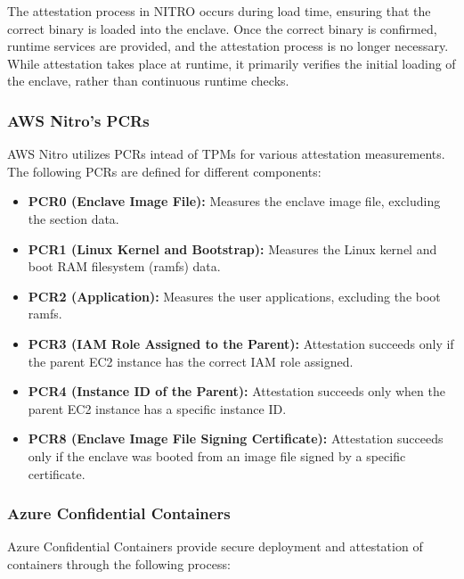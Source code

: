 The attestation process in NITRO occurs during load time, ensuring
that the correct binary is loaded into the enclave. Once the correct
binary is confirmed, runtime services are provided, and the
attestation process is no longer necessary. While attestation takes
place at runtime, it primarily verifies the initial loading of the
enclave, rather than continuous runtime checks.


\subsubsection{AWS Nitro's PCRs}

AWS Nitro utilizes PCRs intead of TPMs for various attestation
measurements. The following PCRs are defined for different components:

\begin{itemize}
    \item \textbf{PCR0 (Enclave Image File):} Measures the enclave
      image file, excluding the section data.
    \item \textbf{PCR1 (Linux Kernel and Bootstrap):} Measures the
      Linux kernel and boot RAM filesystem (ramfs) data.
    \item \textbf{PCR2 (Application):} Measures the user applications,
      excluding the boot ramfs.
    \item \textbf{PCR3 (IAM Role Assigned to the Parent):} Attestation
      succeeds only if the parent EC2 instance has the correct IAM
      role assigned.
    \item \textbf{PCR4 (Instance ID of the Parent):} Attestation
      succeeds only when the parent EC2 instance has a specific
      instance ID.
    \item \textbf{PCR8 (Enclave Image File Signing Certificate):}
      Attestation succeeds only if the enclave was booted from an
      image file signed by a specific certificate.
\end{itemize}

\subsubsection{Azure Confidential Containers}

Azure Confidential Containers provide secure deployment and
attestation of containers through the following process:

